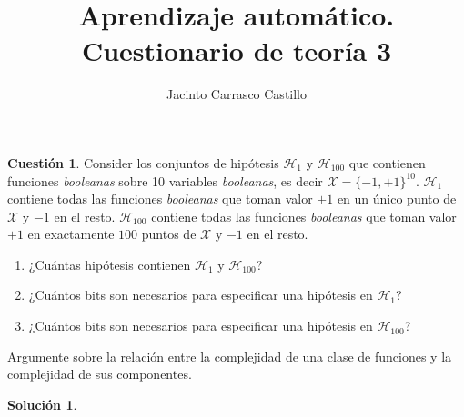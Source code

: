 \documentclass[11pt,leqno]{article}
\title{Aprendizaje autom\'atico. Cuestionario de teor\'ia 3}
\author{Jacinto Carrasco Castillo}
\theoremstyle{definition}
\begin{document}
\maketitle

\newtheorem{cuestion}{Cuestión}
\newtheorem{solucion}{Solución}
\newtheorem{cuestionopcional}{Cuestión Opcional}
\newtheorem{solucionopcional}{Solución Opcional}


\begin{cuestion}
Consider los conjuntos de hipótesis $\mathcal{H}_1$ y $\mathcal{H}_{100}$ que contienen funciones \textit{booleanas} sobre 10 variables \textit{booleanas}, es decir $\mathcal{X} = \{-1, +1\}^{10}$. $\mathcal{H}_1$ contiene todas las funciones \textit{booleanas} que toman valor $+1$ en un único punto de $\mathcal{X}$ y $-1$ en el resto. $\mathcal{H}_{100}$ contiene todas las funciones \textit{booleanas} que toman valor $+1$ en exactamente $100$ puntos de $\mathcal{X}$ y $-1$ en el resto.
\begin{enumerate}[a]
\item ¿Cuántas hipótesis contienen $\mathcal{H}_1$ y $\mathcal{H}_{100}$?
\item ¿Cuántos bits son necesarios para especificar una hipótesis en $\mathcal{H}_1$?
\item ¿Cuántos bits son necesarios para especificar una hipótesis en $\mathcal{H}_{100}$?
\end{enumerate}

	Argumente sobre la relación entre la complejidad de una clase de funciones y la complejidad de sus componentes.
\end{cuestion}

\begin{solucion} 
\end{solucion}
\end{document}
